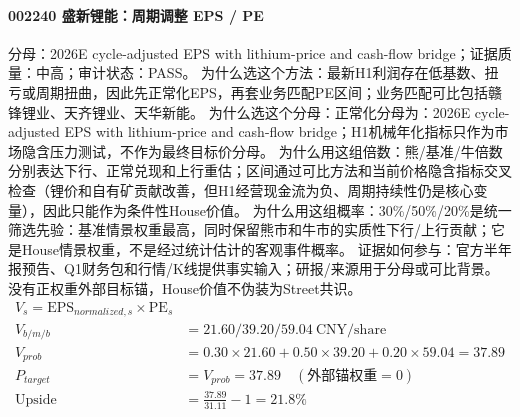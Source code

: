 \paragraph{002240 盛新锂能：周期调整 EPS / PE}
分母：2026E cycle-adjusted EPS with lithium-price and cash-flow bridge；证据质量：中高；审计状态：PASS。
为什么选这个方法：最新H1利润存在低基数、扭亏或周期扭曲，因此先正常化EPS，再套业务匹配PE区间；业务匹配可比包括赣锋锂业、天齐锂业、天华新能。
为什么选这个分母：正常化分母为：2026E cycle-adjusted EPS with lithium-price and cash-flow bridge；H1机械年化指标只作为市场隐含压力测试，不作为最终目标价分母。
为什么用这组倍数：熊/基准/牛倍数分别表达下行、正常兑现和上行重估；区间通过可比方法和当前价格隐含指标交叉检查（锂价和自有矿贡献改善，但H1经营现金流为负、周期持续性仍是核心变量），因此只能作为条件性House价值。
为什么用这组概率：30\%/50\%/20\%是统一筛选先验：基准情景权重最高，同时保留熊市和牛市的实质性下行/上行贡献；它是House情景权重，不是经过统计估计的客观事件概率。
证据如何参与：官方半年报预告、Q1财务包和行情/K线提供事实输入；研报/来源用于分母或可比背景。没有正权重外部目标锚，House价值不伪装为Street共识。
\begin{align*}
V_s=\mathrm{EPS}_{normalized,s}\times \mathrm{PE}_s\\
V_{b/m/b} &= 21.60/39.20/59.04\ \mathrm{CNY/share}\\
V_{prob} &= 0.30\times 21.60+0.50\times 39.20+0.20\times 59.04=37.89\\
P_{target} &= V_{prob}=37.89\quad(\text{外部锚权重}=0)\\
\mathrm{Upside} &= \frac{37.89}{31.11}-1=21.8\%\\
\end{align*}


